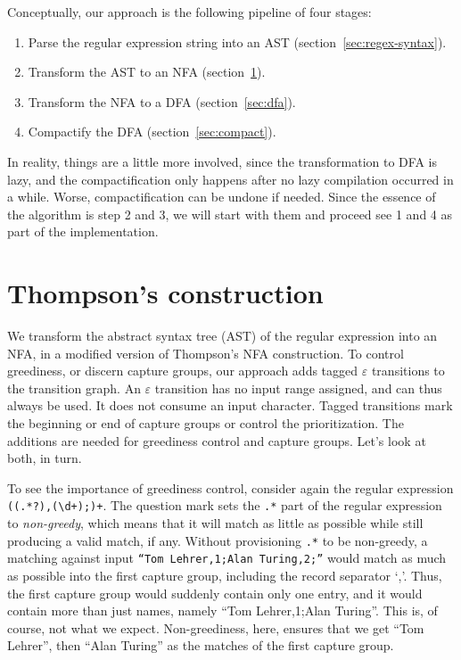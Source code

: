 \documentclass[11pt]{Thesis}
\theoremstyle{definition}
\newcommand{\Secref}[1]{section~\ref{sec:#1}}
\newcommand{\seclabel}[1]{\label{sec:#1}}
\begin{document}
Conceptually, our approach is the following pipeline of four stages:
\begin{enumerate}
  \item Parse the regular expression string into an AST (\Secref{regex-syntax}).
  \item Transform the AST to an NFA (\Secref{thompson}).
  \item Transform the NFA to a DFA (\Secref{dfa}).
  \item Compactify the DFA (\Secref{compact}).
\end{enumerate}

In reality, things are a little more involved, since the transformation
to DFA is lazy, and the compactification only happens after no lazy
compilation occurred in a while. Worse, compactification can be
undone if needed. Since the essence of the algorithm is step 2 and 3, 
we will start with them and proceed see 1 and 4 as part of the implementation.

\section{Thompson's construction} 	\seclabel{thompson}

We transform the abstract syntax tree (AST) of the regular expression into an NFA,
in a modified version of Thompson's NFA construction. To
control greediness, or discern capture groups, our approach adds tagged
$\varepsilon$ transitions to the transition graph. An
$\varepsilon$ transition has no input range assigned, and can thus always
be used. It does not consume an input character. Tagged transitions 
mark the beginning or end of capture groups or control the prioritization.
The additions are needed for greediness control and capture groups.
Let's look at both, in turn.

To see the importance of greediness control, consider again the regular
expression \texttt{((.*?),(\textbackslash{}d+);)+}. The question
mark sets the \texttt{.*} part of the regular expression to
\emph{non-greedy}, which means that it will match as little as
possible while still producing a valid match, if any.  Without
provisioning \texttt{.*} to be non-greedy, a matching against input
\texttt{``Tom Lehrer,1;Alan Turing,2;''} would match as much as
possible into the first capture group, including the record separator
`,'.  Thus, the first capture group would suddenly contain only one
entry, and it would contain more than just names, namely ``Tom
Lehrer,1;Alan Turing''.  This is, of course, not what we expect.
Non-greediness, here, ensures that we get ``Tom Lehrer'', then
``Alan Turing'' as the matches of the first capture group.
\end{document}
